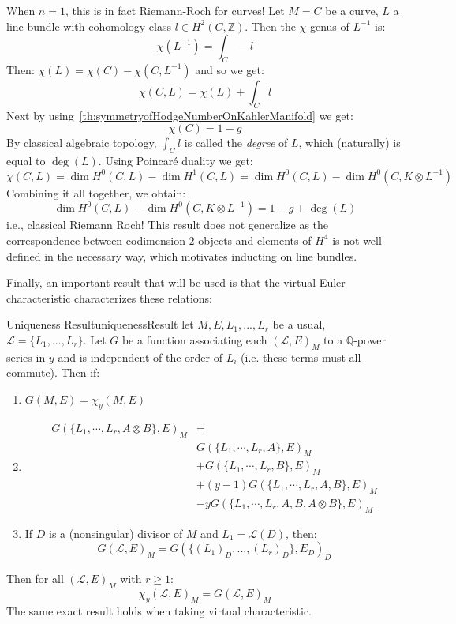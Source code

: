 \documentclass{ut-thesis}
\newcommand{\Q}{{\mathbb{Q}}}
\newcommand{\Z}{{\mathbb{Z}}}
\newcommand{\CL}{{\mathcal{L}}}
\renewcommand{\deg}{{\operatorname{deg}}}
\begin{document}
When $n = 1$, this is in fact Riemann-Roch for curves! Let $M = C$ be a curve, $L$ a line bundle with
cohomology class $l \in H^2(C, \Z)$. Then the $\chi$-genus of $L^{-1}$ is:
\[
  \chi(L^{-1}) = \int_C-l
\]
Then: $\chi(L) = \chi(C) - \chi(C, L^{-1})$ and so we get:
\[
  \chi(C, L) = \chi(L) + \int_C l
\]
Next by using~\cref{th:symmetryofHodgeNumberOnKahlerManifold} we get:
\[
  \chi(C) = 1 - g
\]
By classical algebraic topology, $\int_C l$ is called the \emph{degree} of $L$, which (naturally) is equal to
$\deg(L)$. Using Poincar\'e duality we get:
\[
  \chi(C, L) = \dim H^0(C, L) - \dim H^1(C, L) = \dim H^0(C, L) - \dim H^0(C, K\otimes L^{-1})
\]
Combining it all together, we obtain:
\[
  \dim H^0(C, L) - \dim H^0(C, K\otimes L^{-1}) = 1 - g + \deg(L)
\]
i.e., classical Riemann Roch! This result does not generalize as the correspondence between codimension $2$
objects and elements of $H^4$ is not well-defined in the necessary way, which motivates inducting on line
bundles.


Finally, an important result that will be used is that the virtual Euler characteristic characterizes these relations:

\begin{thm}{Uniqueness Result}{uniquenessResult}
  let $M,E, L_1, ..., L_r$ be a usual, $\CL = \{L_1, ..., L_r\}$. Let $G$ be a function associating each $(\CL,
  E)_M$ to a $\Q$-power series in $y$ and is independent of the order of $L_i$ (i.e. these terms must all
  commute). Then if:
  \begin{enumerate}
    \item $G(M, E) = \chi_y(M,E)$
    \item
  \begin{align*}
  G(\{L_1,\cdots,L_r,A\otimes B\},E)_M &=\\
                 &G(\{L_1,\cdots,L_r,A\},E)_M\\
                 &+ G(\{L_1,\cdots,L_r,B\},E)_M\\
                 &+ (y-1)G(\{L_1,\cdots,L_r,A,B\},E)_M\\
                 &- yG(\{L_1,\cdots,L_r,A,B,A\otimes B\},E)_M
  \end{align*}
  \item If $D$ is a (nonsingular) divisor of $M$ and $L_1 = \CL(D)$, then:
    \[
      G(\CL, E)_M = G(\{(L_1)_D, ..., (L_r)_D\}, E_D)_D
    \]
  \end{enumerate}
  Then for all $(\CL, E)_M$ with $r \ge 1$:
  \[
    \chi_y(\CL, E)_M = G(\CL, E)_M
  \]
  The same exact result holds when taking virtual characteristic.
\end{thm}
\end{document}
